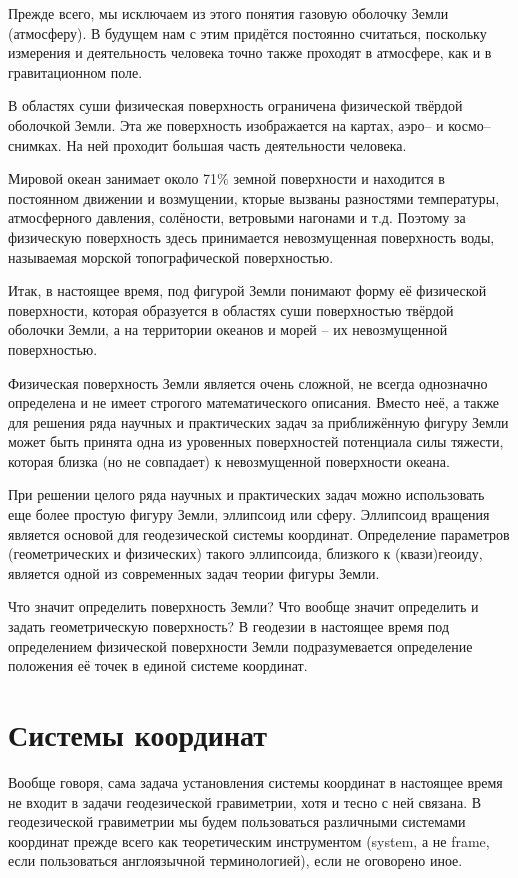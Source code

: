 \documentclass[11pt, a4paper]{article}
\theoremstyle{plain}
\theoremstyle{definition}
\theoremstyle{remark}
\begin{document}
Прежде всего, мы исключаем из этого понятия газовую оболочку Земли (атмосферу). В будущем нам с этим
придётся постоянно считаться, поскольку измерения и деятельность человека точно также проходят в
атмосфере, как и в гравитационном поле.

В областях суши физическая поверхность ограничена физической твёрдой оболочкой Земли. Эта же
поверхность изображается на картах, аэро-- и космо-- снимках. На ней проходит большая часть
деятельности человека. 

Мировой океан занимает около 71\% земной поверхности и находится в постоянном движении и
возмущении, кторые вызваны разностями температуры, атмосферного давления, солёности,
ветровыми нагонами и т.д. Поэтому за физическую поверхность здесь принимается невозмущенная поверхность
воды, называемая морской топографической поверхностью. 

Итак, в настоящее время, под фигурой Земли понимают форму её физической поверхности, которая
образуется в областях суши поверхностью твёрдой оболочки Земли, а на территории океанов и
морей -- их невозмущенной поверхностью. 

Физическая поверхность Земли является очень сложной, не всегда однозначно определена и не имеет 
строгого математического описания.
Вместо неё, а также для решения ряда научных и практических задач за приближённую фигуру 
Земли может быть принята одна из уровенных поверхностей потенциала силы тяжести, которая близка (но не совпадает)
к невозмущенной поверхности океана.

При решении целого ряда научных и практических задач можно использовать еще более простую фигуру
Земли, эллипсоид или сферу. Эллипсоид вращения является основой для геодезической системы координат. 
Определение параметров (геометрических и физических) такого эллипсоида, близкого к (квази)геоиду, является одной из
современных задач теории фигуры Земли.

Что значит определить поверхность Земли? Что вообще значит определить и задать геометрическую
поверхность? В геодезии в настоящее время под определением физической поверхности Земли подразумевается 
определение положения её точек в единой системе координат. 

\section{Системы координат}

Вообще говоря, сама задача установления системы координат в настоящее время не входит в задачи
геодезической гравиметрии, хотя и тесно с ней связана. В геодезической гравиметрии мы будем
пользоваться различными системами координат прежде всего как теоретическим инструментом (system, а
не frame, если пользоваться англоязычной терминологией), если не оговорено иное.
\end{document}
